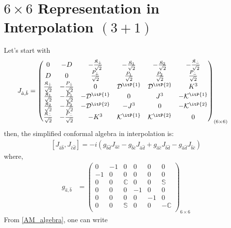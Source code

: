 \documentclass[]{article}
\numberwithin{equation}{section}
\begin{document}
{{\section{$6\times6$ Representation in Interpolation $(3+1)$}
Let's start with 
\begin{align}
    J_{\hat{a},\hat{b}}&=\begin{pmatrix}
    0&-D&-\frac{\mathfrak{K}_{\hat{+}}}{\sqrt{2}}&-\frac{\mathfrak{K}_1}{\sqrt{2}}&-\frac{\mathfrak{K}_2}{\sqrt{2}}&-\frac{\mathfrak{K}_{\hat{-}}}{\sqrt{2}}\\
    D&0&\frac{P_{\hat{+}}}{\sqrt{2}}&\frac{P_{1}}{\sqrt{2}}&\frac{P_{2}}{\sqrt{2}}&\frac{P_{\hat{-}}}{\sqrt{2}}\\
    \frac{\mathfrak{K}_{\hat{+}}}{\sqrt{2}}&-\frac{P_{\hat{+}}}{\sqrt{2}}&0 & {\mathcal{D}}^{\itP{1}} & {\mathcal{D}}^{\itP{2}} & {K}^{3}\\
    \frac{\mathfrak{K}_1}{\sqrt{2}}&-\frac{P_{1}}{\sqrt{2}}&-{\mathcal{D}}^{\itP{1}} & 0 & {J}^{3} & -{\mathcal{K}}^{\itP{1}}\\
    \frac{\mathfrak{K}_2}{\sqrt{2}}&-\frac{P_{2}}{\sqrt{2}}&-{\mathcal{D}}^{\itP{2}} & -{J}^{3} & 0 & -{\mathcal{K}}^{\itP{2}}\\
    \frac{\mathfrak{K}_{\hat{-}}}{\sqrt{2}}&-\frac{P_{\hat{-}}}{\sqrt{2}}&-{K}^{3} & {\mathcal{K}}^{\itP{1}} & {\mathcal{K}}^{\itP{2}} & 0
  \end{pmatrix}_{(6\times6)}
\end{align}
then, the simplified conformal algebra in interpolation is:
  \begin{align}
      \left[J_{{\hat{a}}{\hat{b}}},J_{{\hat{c}}{\hat{d}}}\right]=-i\left(g_{{\hat{b}}{\hat{d}}}J_{{\hat{a}}{\hat{c}}}-g_{{\hat{b}}{\hat{c}}}J_{{\hat{a}}{\hat{d}}}+g_{{\hat{a}}{\hat{c}}}J_{{\hat{b}}{\hat{d}}}-g_{{\hat{a}}{\hat{d}}}J_{{\hat{b}}{\hat{c}}}\right)\label{AM_algebra}
  \end{align}
where, 
\begin{align}
    g_{\hat{a},\hat{b}}&=\begin{pmatrix}
  0&-1&0&0&0&0\\
  -1&0&0&0&0&0\\
  0&0&\mathbb{C}&0&0&\mathbb{S}\\
  0&0&0&-1&0&0\\
  0&0&0&0&-1&0\\
  0&0&\mathbb{S}&0&0&-\mathbb{C}\\
  \end{pmatrix}_{6\times6}
\end{align}
From \eqref{AM_algebra}, one can write
}}
\end{document}
